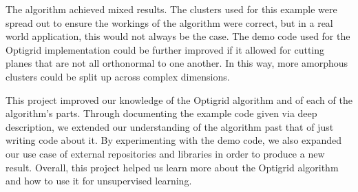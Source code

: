The algorithm achieved mixed results. The clusters used for this example were spread out to ensure the workings of the algorithm were correct, but in a real world application, this would not always be the case.
The demo code used for the Optigrid implementation could be further improved if it allowed for cutting planes that are not all orthonormal to one another. In this way, more amorphous clusters could be split up across complex dimensions.

This project improved our knowledge of the Optigrid algorithm and of each of the algorithm's parts. Through documenting the example code given via deep description, we extended our understanding of the algorithm past that of just writing code about it.
By experimenting with the demo code, we also expanded our use case of external repositories and libraries in order to produce a new result. 
Overall, this project helped us learn more about the Optigrid algorithm and how to use it for unsupervised learning.